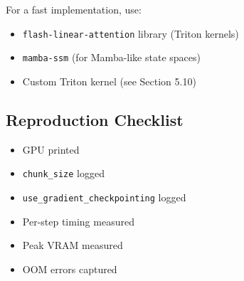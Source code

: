 For a fast implementation, use:

\begin{itemize}
\item \texttt{flash-linear-attention} library (Triton kernels)
\item \texttt{mamba-ssm} (for Mamba-like state spaces)
\item Custom Triton kernel (see Section 5.10)

\end{itemize}
\subsection{Reproduction Checklist}

\begin{itemize}
\item [x] GPU printed
\item [x] \texttt{chunk\_size} logged
\item [x] \texttt{use\_gradient\_checkpointing} logged
\item [x] Per-step timing measured
\item [x] Peak VRAM measured
\item [x] OOM errors captured

\end{itemize}
